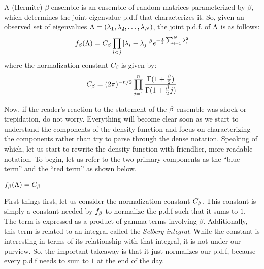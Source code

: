 \begin{definition}
A (Hermite) $\beta$-ensemble is an ensemble of random matrices parameterized by $\beta$, which determines the joint eigenvalue p.d.f that characterizes it.
So, given an observed set of eigenvalues $\L = (\seqo[N]{\lambda})$, the joint p.d.f. of $\L$ is as follows:
\begin{align*}
\jepdf = C_\beta \prod_{i < j} |\lambda_i - \lambda_j|^\beta e^{-\frac{1}{2} \sum_{i=1}^N \lambda_i^2}
\end{align*}
where the normalization constant $C_\beta$ is given by:
\begin{align*}
C_{\beta} = (2\pi)^{-n/2} \prod_{j = 1}^n \frac{\Gamma(1 + \frac{\b}{2})}{\Gamma(1 + \frac{\b}{2}j)}
\end{align*}
\end{definition}


Now, if the reader's reaction to the statement of the $\b$-ensemble was shock or trepidation, do not worry.
Everything will become clear soon as we start to understand the components of the density function and
focus on characterizing the components rather than try to parse through the dense notation.
Speaking of which, let us start to rewrite the density function with friendlier, more readable notation.
To begin, let us refer to the two primary components as the ``blue term'' and the ``red term'' as shown below.
\begin{center}
$\jepdf = \betaconst \; $\bbx{$\blueterm$} \; \rbx{$\redterm$}
\end{center}

 First things first, let us consider the normalization constant $\betaconst$.
This constant is simply a constant needed by $f_\b$ to normalize the p.d.f such that it sums to $1$.
The term is expressed as a product of gamma terms involving $\beta$. Additionally, this term is related to an integral called the \textit{Selberg integral}. %
While the constant is interesting in terms of its relationship with that integral, it is not under our purview. So, the important takeaway is that it just normalizes our p.d.f,
because every p.d.f needs to sum to $1$ at the end of the day.

\bigskip


